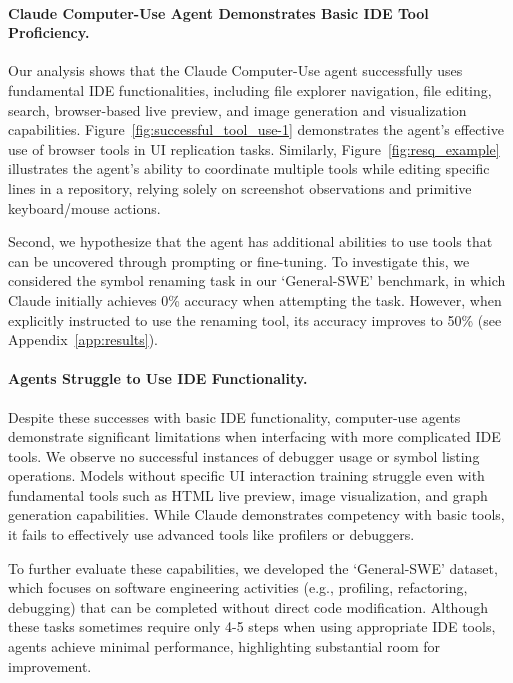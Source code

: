 



\paragraph{Claude Computer-Use Agent Demonstrates Basic IDE Tool Proficiency.}


Our analysis shows that the Claude Computer-Use agent successfully uses fundamental IDE functionalities, including file explorer navigation, file editing, search, browser-based live preview, and image generation and visualization capabilities. Figure~\ref{fig:successful_tool_use-1} demonstrates the agent's effective use of browser tools in UI replication tasks. Similarly, Figure~\ref{fig:resq_example} illustrates the agent's ability to coordinate multiple tools while editing specific lines in a repository, relying solely on screenshot observations and primitive keyboard/mouse actions.

Second, we hypothesize that the agent has additional abilities to use tools that can be uncovered through prompting or fine-tuning. 
To investigate this, we considered the symbol renaming task in our `General-SWE' benchmark, in which Claude initially achieves 0\% accuracy when attempting the task. 
However, when explicitly instructed to use the renaming tool, its accuracy improves to 50\% (see Appendix~\ref{app:results}). 

\paragraph{Agents Struggle to Use IDE Functionality.}
\label{sec:agents_tools}

Despite these successes with basic IDE functionality, computer-use agents demonstrate significant limitations when interfacing with more complicated IDE tools. We observe no successful instances of debugger usage or symbol listing operations. Models without specific UI interaction training struggle even with fundamental tools such as HTML live preview, image visualization, and graph generation capabilities. While Claude demonstrates competency with basic tools, it fails to effectively use advanced tools like profilers or debuggers.

To further evaluate these capabilities, we developed the `General-SWE' dataset, which focuses on software engineering activities (e.g., profiling, refactoring, debugging) that can be completed without direct code modification. Although these tasks sometimes require only 4-5 steps when using appropriate IDE tools, agents achieve minimal performance, highlighting substantial room for improvement.

